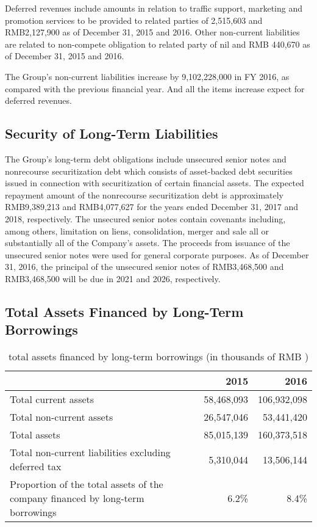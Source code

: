 Deferred revenues include amounts in relation to traffic support, marketing and promotion services to be provided to related parties of 2,515,603 and RMB2,127,900 as of December 31, 2015 and 2016. Other non-current liabilities are related to non-compete obligation to related party of nil and RMB 440,670 as of December 31, 2015 and 2016.

The Group’s non-current liabilities increase by 9,102,228,000 in FY 2016, as compared with the previous financial year. And all the items increase expect for deferred revenues.

\subsection{Security of Long-Term Liabilities}
The Group’s long-term debt obligations include unsecured senior notes and nonrecourse securitization debt which consists of asset-backed debt securities issued in connection with securitization of certain financial assets. The expected repayment amount of the nonrecourse securitization debt is approximately RMB9,389,213 and RMB4,077,627 for the years ended December 31, 2017 and 2018, respectively. The unsecured senior notes contain covenants including, among others, limitation on liens, consolidation, merger and sale all or substantially all of the Company’s assets. The proceeds from issuance of the unsecured senior notes were used for general corporate purposes. As of December 31, 2016, the principal of the unsecured senior notes of RMB3,468,500 and RMB3,468,500 will be due in 2021 and 2026, respectively.

\subsection{Total Assets Financed by Long-Term Borrowings}


\begin{table}[H]	
	\begin{center}
		\begin{tabular}{p{8.3cm}rr}
			\toprule
			&\textbf{2015}&\textbf{2016}\\
			\midrule
			Total current assets&	58,468,093&	106,932,098\\
			Total non-current assets &	26,547,046&	53,441,420\\
			Total assets &	85,015,139&	160,373,518\\
			Total non-current liabilities excluding deferred tax &	5,310,044&	13,506,144\\
			Proportion of the total assets of the company financed by long-term borrowings	&6.2\%&	8.4\%\\
			\bottomrule
		\end{tabular}
	\end{center}
	\caption{total assets financed by long-term borrowings (in thousands of RMB \textyen)}\label{table:1}
\end{table}

